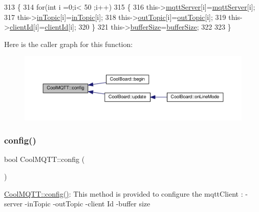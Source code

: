 \begin{DoxyCode}
313 \{
314     \textcolor{keywordflow}{for}(\textcolor{keywordtype}{int} i =0;i< 50 ;i++)
315     \{
316         this->\hyperlink{classCoolMQTT_ab8bb951f87ddbf92db74c2ad16a3e53e}{mqttServer}[i]=\hyperlink{classCoolMQTT_ab8bb951f87ddbf92db74c2ad16a3e53e}{mqttServer}[i];
317         this->\hyperlink{classCoolMQTT_a4492f52a441e83cc5151010317fdb52d}{inTopic}[i]=\hyperlink{classCoolMQTT_a4492f52a441e83cc5151010317fdb52d}{inTopic}[i];
318         this->\hyperlink{classCoolMQTT_a109c786a17b463f9eeba046194279522}{outTopic}[i]=\hyperlink{classCoolMQTT_a109c786a17b463f9eeba046194279522}{outTopic}[i];
319         this->\hyperlink{classCoolMQTT_af01bc6160c5a191e90df1b6e7318828d}{clientId}[i]=\hyperlink{classCoolMQTT_af01bc6160c5a191e90df1b6e7318828d}{clientId}[i];
320     \}
321     this->\hyperlink{classCoolMQTT_a7f3cf26b51d6770f216e42c5ef13ca9f}{bufferSize}=\hyperlink{classCoolMQTT_a7f3cf26b51d6770f216e42c5ef13ca9f}{bufferSize};
322 
323 \}
\end{DoxyCode}
Here is the caller graph for this function\+:
\nopagebreak
\begin{figure}[H]
\begin{center}
\leavevmode
\includegraphics[width=350pt]{classCoolMQTT_a0158596b9a2297c8ba609b56ce6bace1_icgraph}
\end{center}
\end{figure}
\mbox{\label{classCoolMQTT_a6571671781a505feca9a8a56e256c6bc}} 
\subsubsection{\texorpdfstring{config()}{config()}\hspace{0.1cm}{\footnotesize\ttfamily [2/2]}}
{\footnotesize\ttfamily bool Cool\+M\+Q\+T\+T\+::config (\begin{DoxyParamCaption}{ }\end{DoxyParamCaption})}

\hyperlink{classCoolMQTT_a6571671781a505feca9a8a56e256c6bc}{Cool\+M\+Q\+T\+T\+::config()}\+: This method is provided to configure the mqtt\+Client \+: -\/server -\/in\+Topic -\/out\+Topic -\/client Id -\/buffer size

